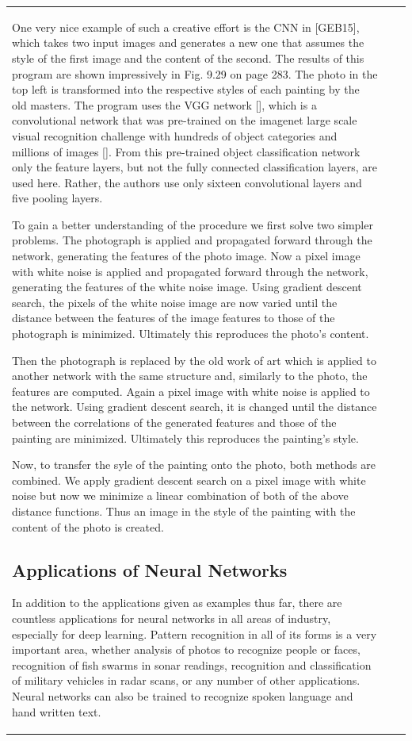 \documentclass[10pt]{book}
\begin{document}
\begin{center}
\begin{tabular}{|l|l|l|}
One very nice example of such a creative effort is the CNN in [GEB15], which takes two input images and generates a new one that assumes the style of the first image and the content of the second. The results of this program are shown impressively in Fig. 9.29 on page 283. The photo in the top left is transformed into the respective styles of each painting by the old masters.
The program uses the VGG network [\cite{sz15}], which is a convolutional network that was pre-trained on the imagenet large scale visual recognition challenge with hundreds of object categories and millions of images [\cite{rds15}]. From this pre-trained object classification network only the feature layers, but not the fully connected classification layers, are used here. Rather, the authors use only sixteen convolutional layers and five pooling layers.

To gain a better understanding of the procedure we first solve two simpler problems. The photograph is applied and propagated forward through the network, generating the features of the photo image. Now a pixel image with white noise is applied and propagated forward through the network, generating the features of the white noise image. Using gradient descent search, the pixels of the white noise image are now varied until the distance between the features of the image features to those of the photograph is minimized. Ultimately this reproduces the photo's content.

Then the photograph is replaced by the old work of art which is applied to another network with the same structure and, similarly to the photo, the features are computed. Again a pixel image with white noise is applied to the network. Using gradient descent search, it is changed until the distance between the correlations of the generated features and those of the painting are minimized. Ultimately this reproduces the painting's style.

Now, to transfer the syle of the painting onto the photo, both methods are combined. We apply gradient descent search on a pixel image with white noise but now we minimize a linear combination of both of the above distance functions. Thus an image in the style of the painting with the content of the photo is created.

\subsection{Applications of Neural Networks}
In addition to the applications given as examples thus far, there are countless applications for neural networks in all areas of industry, especially for deep learning. Pattern recognition in all of its forms is a very important area, whether analysis of photos to recognize people or faces, recognition of fish swarms in sonar readings, recognition and classification of military vehicles in radar scans, or any number of other applications. Neural networks can also be trained to recognize spoken language and hand written text.


\end{tabular}
\end{center}
\end{document}
